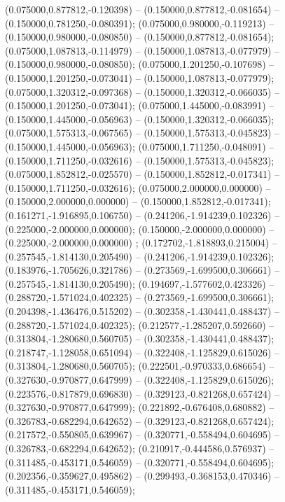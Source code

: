  (0.075000,0.877812,-0.120398) -- (0.150000,0.877812,-0.081654) -- (0.150000,0.781250,-0.080391);
 (0.075000,0.980000,-0.119213) -- (0.150000,0.980000,-0.080850) -- (0.150000,0.877812,-0.081654);
 (0.075000,1.087813,-0.114979) -- (0.150000,1.087813,-0.077979) -- (0.150000,0.980000,-0.080850);
 (0.075000,1.201250,-0.107698) -- (0.150000,1.201250,-0.073041) -- (0.150000,1.087813,-0.077979);
 (0.075000,1.320312,-0.097368) -- (0.150000,1.320312,-0.066035) -- (0.150000,1.201250,-0.073041);
 (0.075000,1.445000,-0.083991) -- (0.150000,1.445000,-0.056963) -- (0.150000,1.320312,-0.066035);
 (0.075000,1.575313,-0.067565) -- (0.150000,1.575313,-0.045823) -- (0.150000,1.445000,-0.056963);
 (0.075000,1.711250,-0.048091) -- (0.150000,1.711250,-0.032616) -- (0.150000,1.575313,-0.045823);
 (0.075000,1.852812,-0.025570) -- (0.150000,1.852812,-0.017341) -- (0.150000,1.711250,-0.032616);
 (0.075000,2.000000,0.000000) -- (0.150000,2.000000,0.000000) -- (0.150000,1.852812,-0.017341);
 (0.161271,-1.916895,0.106750) -- (0.241206,-1.914239,0.102326) -- (0.225000,-2.000000,0.000000);
 (0.150000,-2.000000,0.000000) -- (0.225000,-2.000000,0.000000) ;
 (0.172702,-1.818893,0.215004) -- (0.257545,-1.814130,0.205490) -- (0.241206,-1.914239,0.102326);
 (0.183976,-1.705626,0.321786) -- (0.273569,-1.699500,0.306661) -- (0.257545,-1.814130,0.205490);
 (0.194697,-1.577602,0.423326) -- (0.288720,-1.571024,0.402325) -- (0.273569,-1.699500,0.306661);
 (0.204398,-1.436476,0.515202) -- (0.302358,-1.430441,0.488437) -- (0.288720,-1.571024,0.402325);
 (0.212577,-1.285207,0.592660) -- (0.313804,-1.280680,0.560705) -- (0.302358,-1.430441,0.488437);
 (0.218747,-1.128058,0.651094) -- (0.322408,-1.125829,0.615026) -- (0.313804,-1.280680,0.560705);
 (0.222501,-0.970333,0.686654) -- (0.327630,-0.970877,0.647999) -- (0.322408,-1.125829,0.615026);
 (0.223576,-0.817879,0.696830) -- (0.329123,-0.821268,0.657424) -- (0.327630,-0.970877,0.647999);
 (0.221892,-0.676408,0.680882) -- (0.326783,-0.682294,0.642652) -- (0.329123,-0.821268,0.657424);
 (0.217572,-0.550805,0.639967) -- (0.320771,-0.558494,0.604695) -- (0.326783,-0.682294,0.642652);
 (0.210917,-0.444586,0.576937) -- (0.311485,-0.453171,0.546059) -- (0.320771,-0.558494,0.604695);
 (0.202356,-0.359627,0.495862) -- (0.299493,-0.368153,0.470346) -- (0.311485,-0.453171,0.546059);

